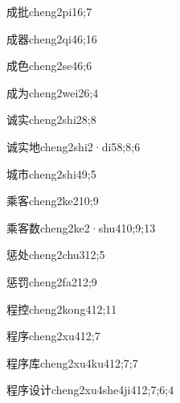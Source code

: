 \begin{verbete}{成批}{cheng2pi1}{6;7}
\end{verbete}
\begin{verbete}{成器}{cheng2qi4}{6;16}
\end{verbete}
\begin{verbete}{成色}{cheng2se4}{6;6}
\end{verbete}
\begin{verbete}{成为}{cheng2wei2}{6;4}
\end{verbete}
\begin{verbete}{诚实}{cheng2shi2}{8;8}
\end{verbete}
\begin{verbete}{诚实地}{cheng2shi2·di5}{8;8;6}
\end{verbete}
\begin{verbete}{城市}{cheng2shi4}{9;5}
\end{verbete}
\begin{verbete}{乘客}{cheng2ke2}{10;9}
\end{verbete}
\begin{verbete}{乘客数}{cheng2ke2·shu4}{10;9;13}
\end{verbete}
\begin{verbete}{惩处}{cheng2chu3}{12;5}
\end{verbete}
\begin{verbete}{惩罚}{cheng2fa2}{12;9}
\end{verbete}
\begin{verbete}{程控}{cheng2kong4}{12;11}
\end{verbete}
\begin{verbete}{程序}{cheng2xu4}{12;7}
\end{verbete}
\begin{verbete}{程序库}{cheng2xu4ku4}{12;7;7}
\end{verbete}
\begin{verbete}{程序设计}{cheng2xu4she4ji4}{12;7;6;4}
\end{verbete}
